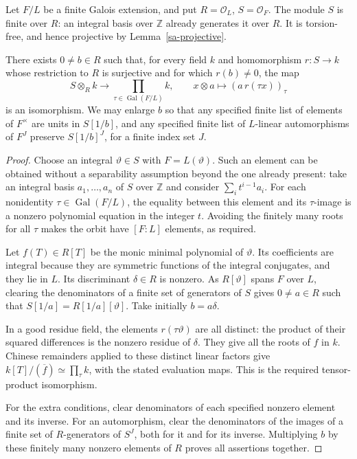 Let \(F/L\) be a finite Galois extension, and put
\(R=\mathcal O_L\), \(S=\mathcal O_F\).
The module \(S\) is finite over \(R\): an integral
basis over \(\mathbb Z\) already generates it over
\(R\).  It is torsion-free, and hence projective
by Lemma~\ref{sa-projective}.

\begin{lemma}\label{sa-split-reduction}
There exists \(0\ne b\in R\) such that, for every
field \(k\) and homomorphism \(r:S\to k\) whose
restriction to \(R\) is surjective and for which
\(r(b)\ne0\), the map
\[
 S\otimes_R k\longrightarrow
              \prod_{\tau\in\operatorname{Gal}(F/L)} k,
 \qquad x\otimes a\longmapsto(a\,r(\tau x))_\tau
\]
is an isomorphism.
We may enlarge \(b\) so that any specified finite
list of elements of \(F^\times\) are units in
\(S[1/b]\), and any specified finite list of
\(L\)-linear automorphisms of \(F^J\) preserve
\(S[1/b]^J\), for a finite index set \(J\).
\end{lemma}
\begin{proof}
Choose an integral \(\vartheta\in S\) with
\(F=L(\vartheta)\).  Such an element can be obtained
without a separability assumption beyond the one
already present: take an integral basis
\(a_1,\ldots,a_n\) of \(S\) over \(\mathbb Z\)
and consider \(\sum_i t^{i-1}a_i\).
For each nonidentity \(\tau\in\operatorname{Gal}(F/L)\),
the equality between this element and its \(\tau\)-image
is a nonzero polynomial equation in the integer \(t\).
Avoiding the finitely many roots for all \(\tau\)
makes the orbit have \([F:L]\) elements, as required.

Let \(f(T)\in R[T]\) be the monic minimal polynomial
of \(\vartheta\).  Its coefficients are integral
because they are symmetric functions of the integral
conjugates, and they lie in \(L\).
Its discriminant \(\delta\in R\) is nonzero.
As \(R[\vartheta]\) spans \(F\) over \(L\),
clearing the denominators of a finite set of generators
of \(S\) gives \(0\ne a\in R\) such that
\(S[1/a]=R[1/a][\vartheta]\).
Take initially \(b=a\delta\).

In a good residue field, the elements
\(r(\tau\vartheta)\) are all distinct: the product
of their squared differences is the nonzero residue
of \(\delta\).
They give all the roots of \(f\) in \(k\).
Chinese remainders applied to these distinct linear
factors give
\(k[T]/(\overline f)\simeq\prod_\tau k\), with
the stated evaluation maps.  This is the required
tensor-product isomorphism.

For the extra conditions, clear denominators of
each specified nonzero element and its inverse.
For an automorphism, clear the denominators of
the images of a finite set of \(R\)-generators of
\(S^J\), both for it and for its inverse.
Multiplying \(b\) by these finitely many nonzero
elements of \(R\) proves all assertions together.
\end{proof}

